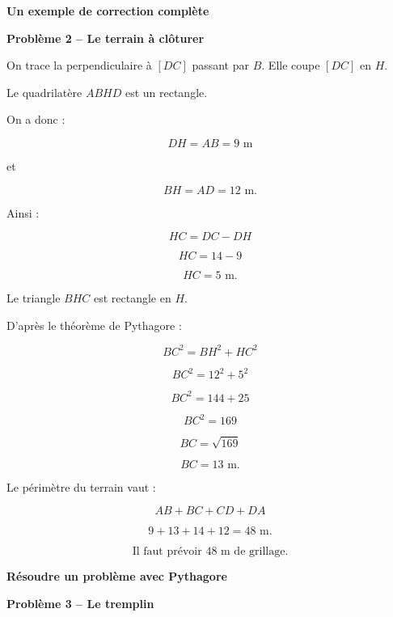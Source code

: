 \documentclass[11pt,a4paper]{article}
\newcommand{\titreprobleme}[2]{%
\noindent
\begin{minipage}{\linewidth}
\centering
{\sffamily\LARGE\bfseries\color{TitreC}
Résoudre un problème avec Pythagore}

\vspace{0.5mm}

{\sffamily\large\bfseries\color{SavoirC}
Problème #1 -- #2}
\end{minipage}

\vspace{1mm}
}
\newcommand{\titrecorrection}[1]{%
\noindent
\begin{minipage}{\linewidth}
\centering
{\sffamily\LARGE\bfseries\color{TitreC}
Un exemple de correction complète}

\vspace{0.5mm}

{\sffamily\large\bfseries\color{SavoirC}
#1}
\end{minipage}

\vspace{2mm}
}
\newcommand{\pagecorrection}[2]{%

\titrecorrection{#1}

\begin{correctionbox}

#2

\end{correctionbox}
}
\begin{document}
\pagecorrection{Problème 2 -- Le terrain à clôturer}{

On trace la perpendiculaire à \([DC]\) passant par \(B\).
Elle coupe \([DC]\) en \(H\).

Le quadrilatère \(ABHD\) est un rectangle.

On a donc :

\[
DH=AB=9\text{ m}
\]

et

\[
BH=AD=12\text{ m}.
\]

Ainsi :

\[
HC=DC-DH
\]

\[
HC=14-9
\]

\[
HC=5\text{ m}.
\]

Le triangle \(BHC\) est rectangle en \(H\).

D'après le théorème de Pythagore :

\[
BC^2=BH^2+HC^2
\]

\[
BC^2=12^2+5^2
\]

\[
BC^2=144+25
\]

\[
BC^2=169
\]

\[
BC=\sqrt{169}
\]

\[
BC=13\text{ m}.
\]

Le périmètre du terrain vaut :

\[
AB+BC+CD+DA
\]

\[
9+13+14+12=48\text{ m}.
\]

\[
\boxed{\text{Il faut prévoir }48\text{ m de grillage}.}
\]
}

\newpage


\titreprobleme{3}{Le tremplin}
\end{document}
